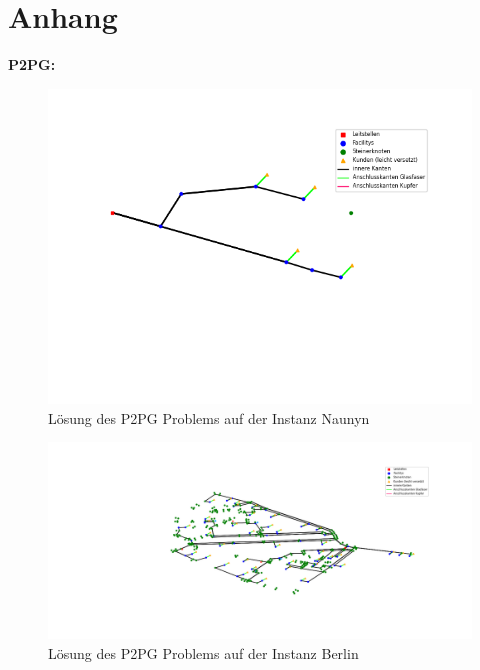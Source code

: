 \documentclass[11pt,a4paper]{article}
\theoremstyle{my_th_style1}
\begin{document}
 
\newpage

\renewcommand{\refname}{Literaturverzeichnis}

\thispagestyle{empty}
\newpage
\appendix
\section*{Anhang}
\textbf{P2PG:}
\begin{figure}[h]
	\begin{center}
		\begin{minipage}{8.0cm}
			\includegraphics[width=1\textwidth]{./Bilder/P2PG_Naunyn}
			\caption{Lösung des P2PG Problems auf der Instanz Naunyn}
		\end{minipage}
	\end{center}
\end{figure}

\begin{figure}[h]
\begin{center}
	\begin{minipage}{12.0cm}
		\includegraphics[width=1\textwidth]{./Bilder/P2PG_Berlin}
		\caption{Lösung des P2PG Problems auf der Instanz Berlin}
	\end{minipage}
\end{center}
\end{figure}
\end{document}
